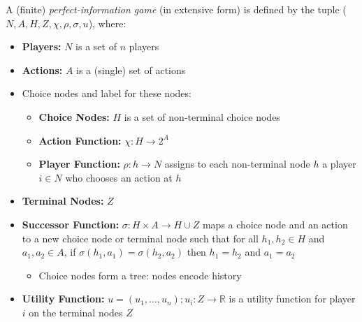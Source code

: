 A (finite) \textit{perfect-information game} (in extensive form) is defined by the tuple ($N, A, H, Z, \chi, \rho, \sigma, u$), where:
\begin{itemize}
\item \textbf{Players:} $N$ is a set of $n$ players
\item \textbf{Actions:} $A$ is a (single) set of actions
\item Choice nodes and label for these nodes:
	\begin{itemize}
	\item \textbf{Choice Nodes:} $H$ is a set of non-terminal choice nodes
	\item \textbf{Action Function:} $\chi : H \rightarrow 2^A$
	\item \textbf{Player Function:} $ \rho: h \rightarrow N$ assigns to each non-terminal node $h$ a player $i \in N$ who chooses an action at $h$
	\end{itemize}
\item \textbf{Terminal Nodes:} $Z$
\item \textbf{Successor Function:} $\sigma : H \times A \rightarrow H  \cup Z$ maps a choice node and an action to a new choice node or terminal node such that for all $h_1, h_2 \in H$ and $a_1,a_2 \in A$, if $\sigma(h_1,a_1) = \sigma(h_2, a_2)$ then $h_1=h_2$ and $a_1=a_2$
	\begin{itemize}
	\item Choice nodes form a tree: nodes encode history
	\end{itemize}
\item \textbf{Utility Function:} $u = (u_1, \dots , u_n); u_i: Z \rightarrow \mathbb{R}$ is a utility function for player $i$ on the terminal nodes $Z$
\end{itemize}\pagebreak
